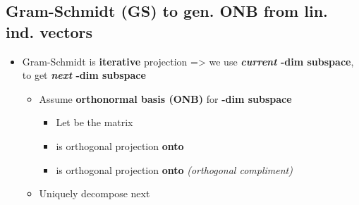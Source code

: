 \subsection*{Gram-Schmidt (GS) to gen. ONB from lin. ind. vectors}
\begin{itemize}

      \item
            Gram-Schmidt is \textbf{iterative} projection => we use
            \textbf{\emph{current} -dim subspace}, to get
            \textbf{\emph{next} -dim subspace}

            \begin{itemize}

                  \item
                        Assume \textbf{orthonormal basis (ONB)}
                        for \textbf{-dim subspace
                              }

                        \begin{itemize}

                              \item
                                    Let
                                    be the matrix
                              \item
                                     is orthogonal projection \textbf{onto
                                          }
                              \item
                                    is orthogonal projection \textbf{onto
                                          } \emph{(orthogonal
                                          compliment)}
                        \end{itemize}
                  \item
                        Uniquely decompose next 
                        \begin{itemize}


\end{itemize}
\end{itemize}
\end{itemize}
